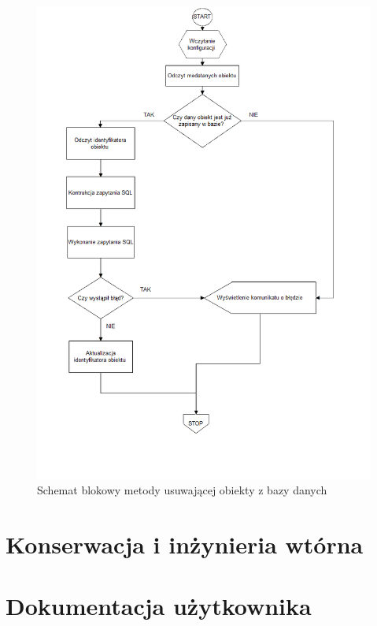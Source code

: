 \documentclass[12pt]{report}
\begin{document}
\begin{figure}[H]
\centering
\includegraphics[width=\textwidth]{resources/remove_schema.png}
\caption{Schemat blokowy metody usuwającej obiekty z bazy danych}
\end{figure}

\section{Konserwacja i inżynieria wtórna} %

\section{Dokumentacja użytkownika}
\end{document}
